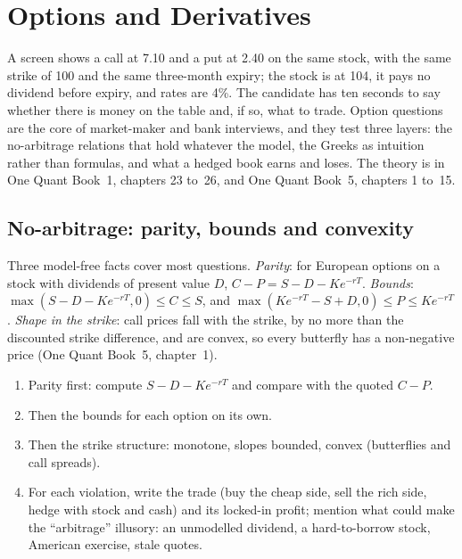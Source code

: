 \chapter{Options and Derivatives}\label{ch:iv:options-and-derivatives}

A screen shows a call at 7.10 and a put at 2.40 on the same stock, with the same strike of 100 and the same
three-month expiry; the stock is at 104, it pays no dividend before expiry, and rates are 4\%. The candidate has ten
seconds to say whether there is money on the table and, if so, what to trade. Option questions are the core of
market-maker and bank interviews, and they test three layers: the no-arbitrage relations that hold whatever the
model, the Greeks as intuition rather than formulas, and what a hedged book earns and loses. The theory is in One
Quant Book~1, chapters 23 to~26, and One Quant Book~5, chapters 1 to~15.

\section{No-arbitrage: parity, bounds and convexity}

Three model-free facts cover most questions. \emph{Parity}: for European options on a stock with dividends of
present value $D$, $C - P = S - D - Ke^{-rT}$. \emph{Bounds}: $\max(S - D - Ke^{-rT}, 0) \le C \le S$, and $\max(Ke^{-rT} - S
+ D, 0) \le P \le Ke^{-rT}$. \emph{Shape in the strike}: call prices fall with the strike, by no more than the discounted
strike difference, and are convex, so every butterfly has a non-negative price (One Quant Book~5, chapter~1).

\begin{method}\label{met:iv:options-and-derivatives:arb}
\begin{enumerate}
\item Parity first: compute $S - D - Ke^{-rT}$ and compare with the quoted $C - P$.
\item Then the bounds for each option on its own.
\item Then the strike structure: monotone, slopes bounded, convex (butterflies and call spreads).
\item For each violation, write the trade (buy the cheap side, sell the rich side, hedge with stock and cash) and its
locked-in profit; mention what could make the ``arbitrage'' illusory: an unmodelled dividend, a hard-to-borrow stock,
American exercise, stale quotes.
\end{enumerate}
\end{method}


